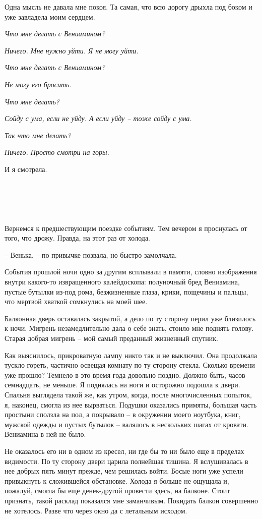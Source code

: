 \documentclass[
]{book}
\begin{document}
Одна мысль не давала мне покоя. Та самая, что всю дорогу дрыхла под боком и уже завладела моим сердцем.

\emph{Что мне делать с Вениамином?}

\emph{Ничего. Мне нужно уйти. Я не могу уйти.}

\emph{Что мне делать с Вениамином?}

\emph{Не могу его бросить.}

\emph{Что мне делать?}

\emph{Сойду с ума, если не уйду. А если уйду -- тоже сойду с ума.}

\emph{Так что мне делать?}

\emph{Ничего. Просто смотри на горы.}

И я смотрела.

\hypertarget{chapter-57}{%
\chapter{~}\label{chapter-57}}

Вернемся к предшествующим поездке событиям. Тем вечером я проснулась от того, что дрожу. Правда, на этот раз от холода.

-- Венька, -- по привычке позвала, но быстро замолчала.

События прошлой ночи одно за другим всплывали в памяти, словно изображения внутри какого-то извращенного калейдоскопа: полуночный бред Вениамина, пустые бутылки из-под рома, безжизненные глаза, крики, пощечины и пальцы, что мертвой хваткой сомкнулись на моей шее.

Балконная дверь оставалась закрытой, а дело по ту сторону перил уже близилось к ночи. Мигрень незамедлительно дала о себе знать, стоило мне поднять голову. Старая добрая мигрень -- мой самый преданный жизненный спутник.

Как выяснилось, прикроватную лампу никто так и не выключил. Она продолжала тускло гореть, частично освещая комнату по ту сторону стекла. Сколько времени уже прошло? Темнело в это время года довольно поздно. Должно быть, часов семнадцать, не меньше. Я поднялась на ноги и осторожно подошла к двери. Спальня выглядела такой же, как утром, когда, после многочисленных попыток, я, наконец, смогла из нее вырваться. Подушки оказались примяты, большая часть простыни сползла на пол, а покрывало -- в окружении моего ноутбука, книг, мужской одежды и пустых бутылок -- валялось в нескольких шагах от кровати. Вениамина в ней не было.

Не оказалось его ни в одном из кресел, ни где бы то ни было еще в пределах видимости. По ту сторону двери царила полнейшая тишина. Я вслушивалась в нее добрых пять минут прежде, чем решилась войти. Босые ноги уже успели привыкнуть к сложившейся обстановке. Холода я больше не ощущала и, пожалуй, смогла бы еще денек-другой провести здесь, на балконе. Стоит признать, такой расклад показался мне заманчивым. Покидать балкон совершенно не хотелось. Разве что через окно да с летальным исходом.
\end{document}
